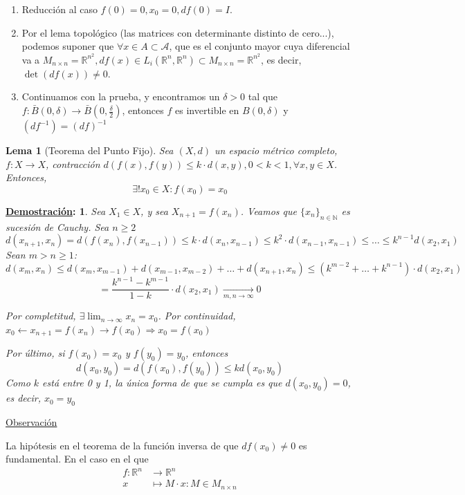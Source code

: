 \documentclass[10pt,a4paper,openright]{book}
\theoremstyle{break}
\newtheorem*{lema}{Lema}
\newtheorem*{demo}{\underline{Demostración}:}
\begin{document}
\begin{enumerate}
\item Reducción al caso $f(0)=0, x_0 = 0, df(0) = I$.
\item Por el lema topológico (las matrices con determinante distinto de cero...), podemos suponer que $\forall x \in A \subset \mathcal{A}$, que es el conjunto mayor cuya diferencial va a $M_{n \times n} = \mathbb{R}^{n^2}, df(x) \in L_i (\mathbb{R}^n, \mathbb{R}^n) \subset M_{n \times n} = \mathbb{R}^{n^2}$, es decir, $\det(df(x)) \neq 0$.
\item Continuamos con la prueba, y encontramos un $\delta > 0$ tal que $f: \bar{B}(0, \delta) \to \bar{B}(0, \frac{\delta}{2})$, entonces $f$ es invertible en $B(0, \delta)$ y $(df^{-1}) = (df)^{-1}$
\end{enumerate}

\begin{lema}[Teorema del Punto Fijo]
Sea $(X, d)$ un espacio métrico completo, $f: X \to X$, contracción $d(f(x),f(y)) \leq k \cdot d(x,y), 0 < k < 1, \forall x,y \in X$. Entonces, $$\exists ! x_0 \in X : f(x_0) = x_0$$
\end{lema}

\begin{demo}
Sea $X_1 \in X$, y sea $X_{n+1} = f(x_n)$. Veamos que $\{x_n\}_{n \in \mathbb{N}}$ es sucesión de Cauchy. Sea $n \geq 2$
$$d(x_{n+1}, x_n) = d(f(x_n), f(x_{n-1})) \leq k \cdot d(x_n, x_{n-1}) \leq k^2 \cdot d(x_{n-1}, x_{n-1}) \leq \ldots \leq k^{n-1} d(x_2, x_1)$$ 
Sean $m > n \geq 1$:
$$d(x_m, x_n) \leq d(x_m, x_{m-1}) + d(x_{m-1}, x_{m-2}) + \ldots + d(x_{n+1}, x_n) \leq (k^{m-2} + \ldots + k^{n-1}) \cdot d(x_2, x_1)$$
$$= \frac{k^{n-1} - k^{m-1}}{1 - k} \cdot d(x_2, x_1) \xrightarrow[m,n \to \infty]{} 0$$

Por completitud, $\exists \lim_{n \to \infty} x_n = x_0$. Por continuidad, $ x_0 \leftarrow x_{n+1} = f(x_n) \to f(x_0) \Rightarrow x_0 = f(x_0)$

Por último, si $f(x_0) = x_0$ y $f(y_0) = y_0$, entonces $$d(x_0, y_0) = d(f(x_0), f(y_0)) \leq k d(x_0, y_0)$$
Como $k$ está entre 0 y 1, la única forma de que se cumpla es que $d(x_0, y_0) = 0$, es decir, $x_0 = y_0$
\end{demo}

\underline{Observación}

La hipótesis en el teorema de la función inversa de que $df(x_0) \neq 0$ es fundamental. En el caso en el que \begin{align*}
f : \mathbb{R}^n &\to \mathbb{R}^n \\ x &\mapsto M \cdot x : M \in M_{n \times n}
\end{align*}
\end{document}
